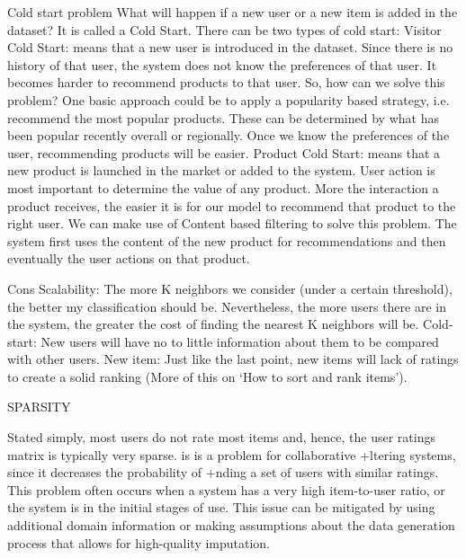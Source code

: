 Cold start problem
What will happen if a new user or a new item is added in the dataset? It is called a Cold Start. There can be two types of cold start:
	Visitor Cold Start: means that a new user is introduced in the dataset. Since there is no history of that user, the system does not 
know the preferences of that user. It becomes harder to recommend products to that user. So, how can we solve this problem? One basic
approach could be to apply a popularity based strategy, i.e. recommend the most popular products. These can be determined by what has
been popular recently overall or regionally. Once we know the preferences of the user, recommending products will be easier.
	Product Cold Start: means that a new product is launched in the market or added to the system. User action is most important to
determine the value of any product. More the interaction a product receives, the easier it is for our model to recommend that product
to the right user. We can make use of Content based filtering to solve this problem. The system first uses the content of the new 
product for recommendations and then eventually the user actions on that product.


  Cons
	Scalability: The more K neighbors we consider (under a certain threshold), the better my classification should be. 
  Nevertheless, the more users there are in the system, the greater the cost of finding the nearest K neighbors will be.
	Cold-start: New users will have no to little information about them to be compared with other users.
	New item: Just like the last point, new items will lack of ratings to create a solid ranking (More of this on ‘How to sort 
  and rank items’).

SPARSITY

Stated simply, most users do not rate most items and, hence, the user ratings matrix is typically very sparse. is is a problem for 
collaborative +ltering systems, since it decreases the probability of +nding a set of users with similar ratings. This problem often 
occurs when a system has a very high item-to-user ratio, or the system is in the initial stages of use. This issue can be mitigated by 
using additional domain information or making assumptions about the data generation process that allows for high-quality imputation.

